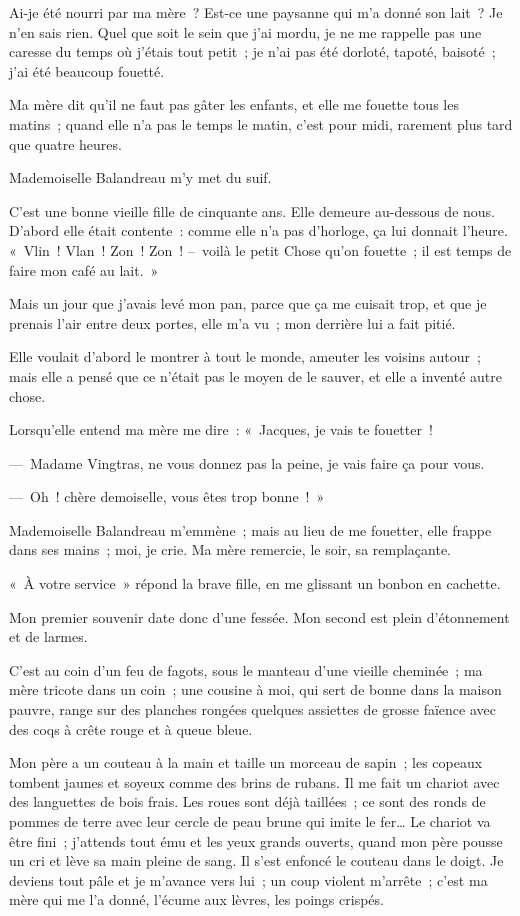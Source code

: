 \documentclass[french,twoside]{book} %
\begin{document}
\noindent Ai-je été nourri par ma mère ? Est-ce une paysanne qui m’a donné son lait ? Je n’en sais rien. Quel que soit le sein que j’ai mordu, je ne me rappelle pas une caresse du temps où j’étais tout petit ; je n’ai pas été dorloté, tapoté, baisoté ; j’ai été beaucoup fouetté.\par
Ma mère dit qu’il ne faut pas gâter les enfants, et elle me fouette tous les matins ; quand elle n’a pas le temps le matin, c’est pour midi, rarement plus tard que quatre heures.\par
Mademoiselle Balandreau m’y met du suif.\par
C’est une bonne vieille fille de cinquante ans. Elle demeure au-dessous de nous. D’abord elle était contente : comme elle n’a pas d’horloge, ça lui donnait l’heure. « Vlin ! Vlan ! Zon ! Zon ! – voilà le petit Chose qu’on fouette ; il est temps de faire mon café au lait. »\par
Mais un jour que j’avais levé mon pan, parce que ça me cuisait trop, et que je prenais l’air entre deux portes, elle m’a vu ; mon derrière lui a fait pitié.\par
Elle voulait d’abord le montrer à tout le monde, ameuter les voisins autour ; mais elle a pensé que ce n’était pas le moyen de le sauver, et elle a inventé autre chose.\par
Lorsqu’elle entend ma mère me dire : « Jacques, je vais te fouetter !\par
— Madame Vingtras, ne vous donnez pas la peine, je vais faire ça pour vous.\par
— Oh ! chère demoiselle, vous êtes trop bonne ! »\par
Mademoiselle Balandreau m’emmène ; mais au lieu de me fouetter, elle frappe dans ses mains ; moi, je crie. Ma mère remercie, le soir, sa remplaçante.\par
« À votre service » répond la brave fille, en me glissant un bonbon en cachette.\par
Mon premier souvenir date donc d’une fessée. Mon second est plein d’étonnement et de larmes.\par
\bigbreak
\noindent C’est au coin d’un feu de fagots, sous le manteau d’une vieille cheminée ; ma mère tricote dans un coin ; une cousine à moi, qui sert de bonne dans la maison pauvre, range sur des planches rongées quelques assiettes de grosse faïence avec des coqs à crête rouge et à queue bleue.\par
Mon père a un couteau à la main et taille un morceau de sapin ; les copeaux tombent jaunes et soyeux comme des brins de rubans. Il me fait un chariot avec des languettes de bois frais. Les roues sont déjà taillées ; ce sont des ronds de pommes de terre avec leur cercle de peau brune qui imite le fer… Le chariot va être fini ; j’attends tout ému et les yeux grands ouverts, quand mon père pousse un cri et lève sa main pleine de sang. Il s’est enfoncé le couteau dans le doigt. Je deviens tout pâle et je m’avance vers lui ; un coup violent m’arrête ; c’est ma mère qui me l’a donné, l’écume aux lèvres, les poings crispés.\par
\end{document}
